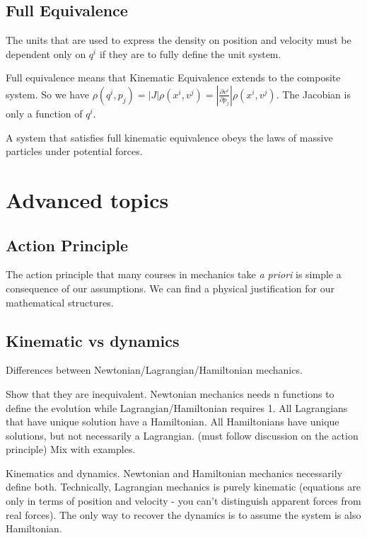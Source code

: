 \documentclass{article}
\begin{document}
\subsection{Full Equivalence}

The units that are used to express the density on position and velocity must be dependent only on $q^i$ if they are to fully define the unit system.

\begin{defn}
	Full equivalence means that Kinematic Equivalence extends to the composite system. So we have $\rho(q^i,p_j) = \left|J\right|\rho(x^i,v^j) = \left|\frac{\partial v^i}{\partial p_j}\right|\rho(x^i,v^j)$. The Jacobian is only a function of $q^i$.
\end{defn}

\begin{prop}
	A system that satisfies full kinematic equivalence obeys the laws of massive particles under potential forces.
\end{prop}

\section{Advanced topics}

\subsection{Action Principle}

The action principle that many courses in mechanics take \emph{a priori} is simple a consequence of our assumptions. We can find a physical justification for our mathematical structures.

\subsection{Kinematic vs dynamics}

Differences between Newtonian/Lagrangian/Hamiltonian mechanics.

Show that they are inequivalent. Newtonian mechanics needs n functions to define the evolution while Lagrangian/Hamiltonian requires 1. All Lagrangians that have unique solution have a Hamiltonian. All Hamiltonians have unique solutions, but not necessarily a Lagrangian. (must follow discussion on the action principle) Mix with examples.

Kinematics and dynamics. Newtonian and Hamiltonian mechanics necessarily define both. Technically, Lagrangian mechanics is purely kinematic (equations are only in terms of position and velocity - you can't distinguish apparent forces from real forces). The only way to recover the dynamics is to assume the system is also Hamiltonian.
\end{document}

